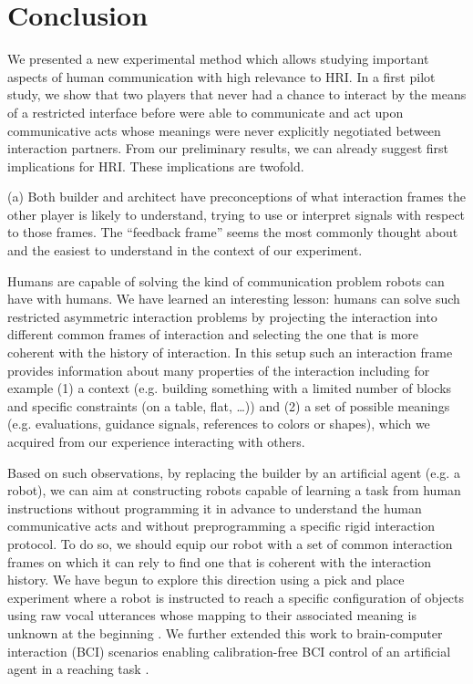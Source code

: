 
\section{Conclusion}

We presented a new experimental method which allows studying important aspects of human communication with high relevance to HRI.
In a first pilot study, we show that two players that never had a chance to interact by the means of a restricted interface before were able to communicate and act upon communicative acts whose meanings were never explicitly negotiated between interaction partners. From our preliminary results, we can already suggest first implications for HRI. These implications are twofold.

(a) Both builder and architect have preconceptions of what interaction frames the other player is likely to understand, trying to use or interpret signals with respect to those frames. The ``feedback frame'' seems the most commonly thought about and the easiest to understand in the context of our experiment.

Humans are capable of solving the kind of communication problem robots can have with humans. We have learned an interesting lesson: humans can solve such restricted asymmetric interaction problems by projecting the interaction into different common frames of interaction and selecting the one that is more coherent with the history of interaction. In this setup such an interaction frame provides information about many properties of the interaction including for example (1) a context (e.g. building something with a limited number of blocks and specific constraints (on a table, flat, \ldots)) and (2) a set of possible meanings (e.g. evaluations, guidance signals, references to colors or shapes), which we acquired from our experience interacting with others. 

Based on such observations, by replacing the builder by an artificial agent (e.g. a robot), we can aim at constructing robots capable of learning a task from human instructions without programming it in advance to understand the human communicative acts and without preprogramming a specific rigid interaction protocol. To do so, we should equip our robot with a set of common interaction frames on which it can rely to find one that is coherent with the interaction history. We have begun to explore this direction using a pick and place experiment where a robot is instructed to reach a specific configuration of objects using raw vocal utterances whose mapping to their associated meaning is unknown at the beginning \cite{grizou2013robot}. We further extended this work to brain-computer interaction (BCI) scenarios enabling calibration-free BCI control of an artificial agent in a reaching task \cite{grizou2014calibration}.

